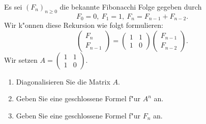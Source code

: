 \documentclass[a4,11pt]{article}
\begin{document}
\begin{aufgabe}[4 Punkte]
Es sei $(F_n)_{n\geq 0}$ die bekannte Fibonacchi Folge gegeben durch
\[
F_0 = 0, \ F_1 = 1, \  F_{n} = F_{n-1} + F_{n-2}.
\]
Wir k"onnen diese Rekursion wie folgt formulieren:
\[
\begin{pmatrix}F_{n} \\ F_{n-1}\end{pmatrix} =
\begin{pmatrix} 1 & 1\\ 1 & 0\end{pmatrix}
\begin{pmatrix}F_{n-1} \\ F_{n-2}\end{pmatrix}.
\]
Wir setzen $A = \begin{pmatrix} 1 & 1\\ 1 & 0\end{pmatrix}$.
  
\begin{enumerate}
\item Diagonalisieren Sie die Matrix $A$.
\item Geben Sie eine geschlossene Formel f"ur $A^n$ an.
\item Geben Sie eine geschlossene Formel f"ur $F_n$ an.
\end{enumerate}

\end{aufgabe}
\end{document}

